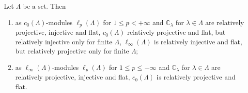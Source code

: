 \begin{proposition}\label{c0AndlInftyModsRelTh} Let $\Lambda$ be a set. Then

\begin{enumerate}[label = (\roman*)]
    \item as $c_0(\Lambda)$-modules $\ell_p(\Lambda)$ for $1\leq p<+\infty$ and
    $\mathbb{C}_\lambda$ for $\lambda\in\Lambda$ are relatively projective,
    injective and flat, $c_0(\Lambda)$ relatively projective and flat, but
    relatively injective only for finite $\Lambda$, $\ell_\infty(\Lambda)$ is
    relatively injective and flat, but relatively projective only for finite
    $\Lambda$;

    \item as $\ell_\infty(\Lambda)$-modules $\ell_p(\Lambda)$ for 
    $1\leq p\leq+\infty$ and $\mathbb{C}_\lambda$ for $\lambda\in\Lambda$ 
    are relatively projective, injective and flat, $c_0(\Lambda)$ is 
    relatively projective and flat.
\end{enumerate}
\end{proposition}
